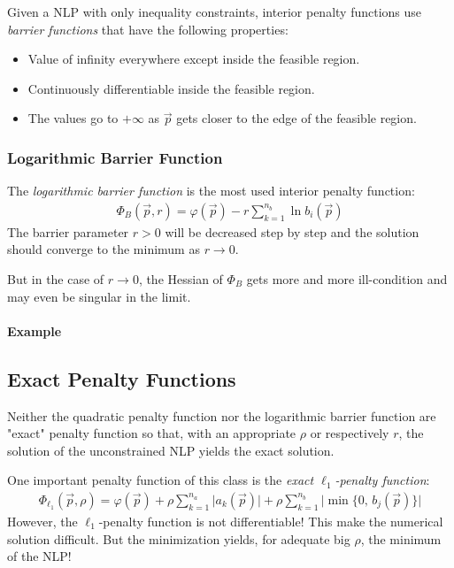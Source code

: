 			Given a NLP with only inequality constraints, interior penalty functions use \emph{barrier functions} that have the following properties:
			\begin{itemize}
				\item Value of infinity everywhere except inside the feasible region.
				\item Continuously differentiable inside the feasible region.
				\item The values go to \( +\infty \) as \(\vec{p}\) gets closer to the edge of the feasible region.
			\end{itemize}
		
			\subsubsection{Logarithmic Barrier Function}
				The \emph{logarithmic barrier function} is the most used interior penalty function:
				\begin{align*}
					\Phi_B(\vec{p}, r) = \varphi(\vec{p}) - r \sum_{k = 1}^{n_b} \ln b_i(\vec{p})
				\end{align*}
				The barrier parameter \( r > 0 \) will be decreased step by step and the solution should converge to the minimum as \( r \to 0 \).
				
				But in the case of \( r \to 0 \), the Hessian of \( \Phi_B \) gets more and more ill-condition and may even be singular in the limit.

			\paragraph{Example} %

		\subsection{Exact Penalty Functions}
			Neither the quadratic penalty function nor the logarithmic barrier function are "exact" penalty function so that, with an appropriate \(\rho\) or respectively \(r\), the solution of the unconstrained NLP yields the exact solution.
			
			One important penalty function of this class is the \emph{exact \(\ell_1\)-penalty function}:
			\begin{align*}
				\Phi_{\ell_1}(\vec{p}, \rho) = \varphi(\vec{p}) + \rho \sum_{k = 1}^{n_a} \big\lvert a_k(\vec{p}) \big\rvert + \rho \sum_{k = 1}^{n_b} \big\lvert\! \min\{ 0,\, b_j(\vec{p}) \} \big\rvert
			\end{align*}
			However, the \(\ell_1\)-penalty function is not differentiable! This make the numerical solution difficult. But the minimization yields, for adequate big \(\rho\), the minimum of the NLP!

